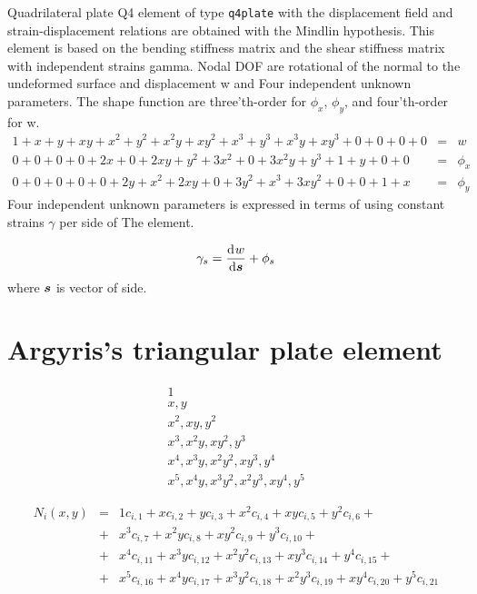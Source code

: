 Quadrilateral plate Q4 element of type {\tt q4plate} with the displacement field and strain-displacement relations 
are obtained with the Mindlin hypothesis. This element is based on the bending stiffness matrix and the shear stiffness
matrix with independent strains gamma. 
Nodal DOF are rotational of the normal to the undeformed surface and displacement w and Four independent unknown parameters. 
The shape function are three'th-order for $\phi_x$, $\phi_y$, and four'th-order for w. 
\begin{eqnarray}
1 + x + y + xy + x^2 + y^2 + x^2y + xy^2 + x^3 + y^3 + x^3y + xy^3 + 0 + 0 + 0 + 0 &=& w\\
0 + 0 + 0 + 0  + 2x + 0  + 2xy + y^2  + 3x^2 + 0   + 3x^2y + y^3 +  1 + y + 0 + 0 &=& \phi_x\\
0 + 0 + 0 + 0  + 0  + 2y + x^2  + 2xy + 0   + 3y^2 + x^3  + 3xy^2 + 0 + 0 + 1 + x &=& \phi_y
\end{eqnarray}
Four independent unknown parameters is expressed in terms of using constant strains $\gamma$ per side of The element.

\begin{equation}
\gamma_s = \mbox{$\displaystyle\frac{{\rm d}\>\!{w}}{{\rm d}{\mbox{\boldmath$s$}}}$} + \phi_{s}
\end{equation}
where $\mbox{\boldmath$s$}$ is vector of side.

\section{Argyris's triangular plate element}

\begin{eqnarray}
1
\\
x,y
\\
x^2,xy,y^2
\\
x^3,x^2y,xy^2,y^3
\\
x^4,x^3y,x^2y^2,xy^3,y^4
\\
x^5,x^4y,x^3y^2,x^2y^3,xy^4,y^5
\end{eqnarray}

\begin{eqnarray}
N_i(x,y) &=& 1 c_{i,1} + x c_{i,2} + y c_{i,3} + x^2 c_{i,4} + xy c_{i,5} + y^2 c_{i,6} +
\\
&+& x^3 c_{i,7} + x^2y c_{i,8} + xy^2 c_{i,9} + y^3 c_{i,10} +
\\
&+& x^4 c_{i,11} + x^3y c_{i,12} + x^2y^2 c_{i,13} + xy^3 c_{i,14} + y^4 c_{i,15} +
\\
&+& x^5 c_{i,16} + x^4y c_{i,17} + x^3y^2 c_{i,18} + x^2y^3 c_{i,19} + xy^4 c_{i,20} + y^5 c_{i,21}
\end{eqnarray}

